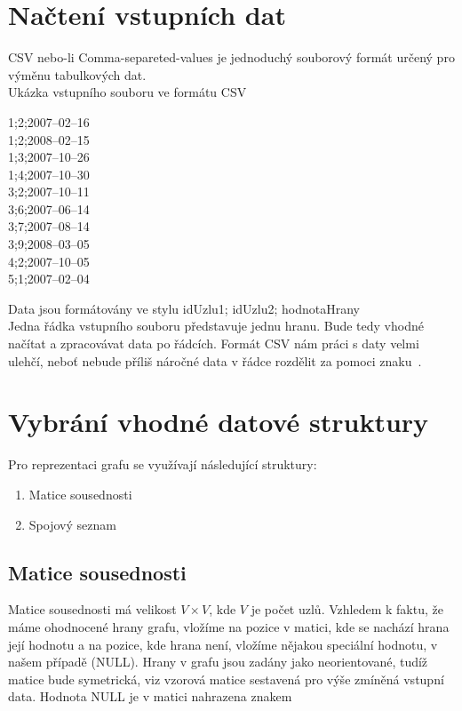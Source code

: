 \documentclass[
12pt,
a4paper,
pdftex,
czech,
titlepage
]{report}
\begin{document}
\section{Načtení vstupních dat}
CSV nebo-li Comma-separeted-values je jednoduchý souborový formát určený pro výměnu tabulkových dat.\\

Ukázka vstupního souboru ve formátu CSV
\begin{framed}
	1;2;2007--02--16\\
	1;2;2008--02--15\\
	1;3;2007--10--26\\
	1;4;2007--10--30\\
	3;2;2007--10--11\\
	3;6;2007--06--14\\
	3;7;2007--08--14\\
	3;9;2008--03--05\\
	4;2;2007--10--05\\
	5;1;2007--02--04
\end{framed}

Data jsou formátovány ve stylu idUzlu1; idUzlu2; hodnotaHrany\\

Jedna řádka vstupního souboru představuje jednu hranu. Bude tedy vhodné načítat a zpracovávat data po řádcích. Formát CSV nám práci s daty velmi ulehčí, neboť nebude příliš náročné data v řádce rozdělit za pomoci znaku~\uv{\textbf{;}}.

\section{Vybrání vhodné datové struktury}
Pro reprezentaci grafu se využívají následující struktury:
\begin{enumerate}
	\item Matice sousednosti
	\item Spojový seznam
\end{enumerate}

\subsection{Matice sousednosti}
Matice sousednosti má velikost $V \times V$, kde $V$ je počet uzlů. Vzhledem k faktu, že máme ohodnocené hrany grafu, vložíme na pozice v matici, kde se nachází hrana její hodnotu a na pozice, kde hrana není, vložíme nějakou speciální hodnotu, v našem případě (NULL). Hrany v grafu jsou zadány jako neorientované, tudíž matice bude symetrická, viz vzorová matice sestavená pro výše zmíněná vstupní data. Hodnota NULL je v matici nahrazena znakem \uv{--}\\
\end{document}
